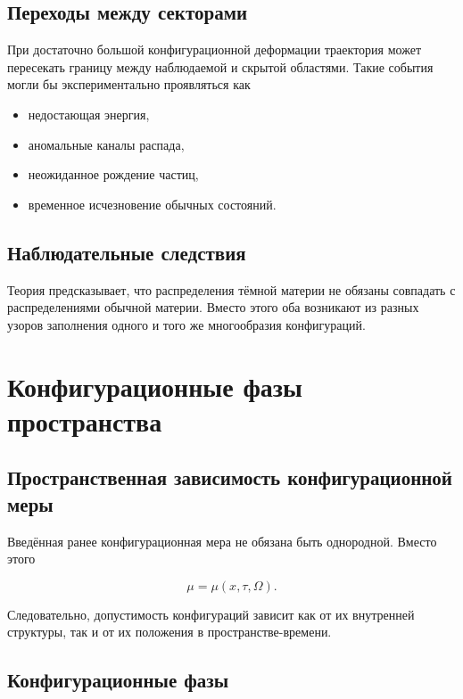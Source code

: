 \section{Переходы между секторами}

При достаточно большой конфигурационной деформации траектория может пересекать границу между наблюдаемой и скрытой областями. Такие события могли бы экспериментально проявляться как

\begin{itemize}

\item недостающая энергия,

\item аномальные каналы распада,

\item неожиданное рождение частиц,

\item временное исчезновение
обычных состояний.

\end{itemize}

\section{Наблюдательные следствия}

Теория предсказывает, что распределения тёмной материи не обязаны совпадать с распределениями обычной материи. Вместо этого оба возникают из разных узоров заполнения одного и того же многообразия конфигураций.

\chapter{Конфигурационные фазы пространства}

\section{Пространственная зависимость конфигурационной меры}

Введённая ранее конфигурационная мера не обязана быть однородной. Вместо этого

\[ \boxed{ \mu=\mu(x,\tau,\Omega). } \]

Следовательно, допустимость конфигураций зависит как от их внутренней структуры, так и от их положения в пространстве-времени.

\section{Конфигурационные фазы}

